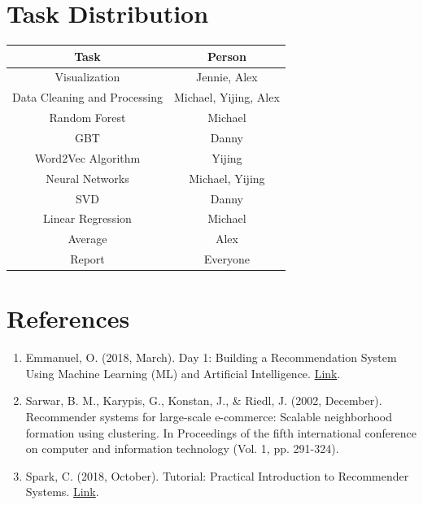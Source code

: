 \documentclass{sig-alternate-05-2015}
\begin{document}
\section{Task Distribution}

\begin{center}
    \begin{tabular}{c|c}
        Task & Person \\
        \hline
        Visualization & Jennie, Alex \\
        Data Cleaning and Processing & Michael, Yijing, Alex\\
        Random Forest & Michael \\
        GBT & Danny \\
        Word2Vec Algorithm & Yijing \\
        Neural Networks & Michael, Yijing \\
        SVD & Danny \\
        Linear Regression & Michael\\
        Average & Alex\\
        Report & Everyone \\
    \end{tabular}
\end{center}

\section{References}

\begin{enumerate}
    \item Emmanuel, O. (2018, March). Day 1: Building a
    Recommendation System Using Machine Learning (ML) and Artificial Intelligence.
    \href{https://medium.com/the-happiness-of-pursuit/day-1-building-a-recommendation-system-using-machine-
    learning-ml-and-artificial-intelligence-c8b2c5ef53a8}{Link}.

    \item Sarwar, B. M., Karypis, G., Konstan, J., \& Riedl, J. (2002, December).
    Recommender systems for large-scale e-commerce: Scalable neighborhood formation using
    clustering. In Proceedings of the fifth international conference on computer and information technology (Vol. 1, pp. 291-324).

    \item Spark, C. (2018, October). Tutorial: Practical Introduction to Recommender
    Systems. \href{https://blog.cambridgespark.com/tutorial-practical-introduction-to-recommender-systems-dbe22848392b}{Link}.
\end{enumerate}
\end{document}
